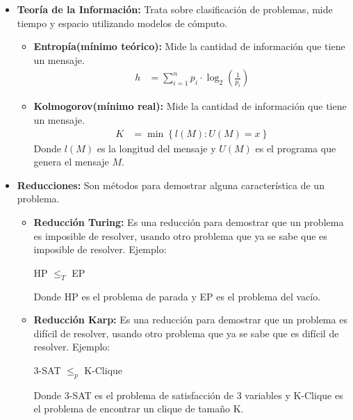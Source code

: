 \documentclass{templateNote}
\begin{document}
\begin{itemize}
\begin{itemize}
        \item \textbf{Teoría de la Información:} Trata sobre clasificación de problemas, mide tiempo y espacio utilizando modelos de cómputo.
        \begin{itemize}
            \item \textbf{Entropía(mínimo teórico):} Mide la cantidad de información que tiene un mensaje.
            \begin{align*}
                h &=  \sum_{i=1}^{n} p_i \cdot \log_2 \left( \frac{1}{p_i} \right)
            \end{align*}
                
            \item \textbf{Kolmogorov(mínimo real):} Mide la cantidad de información que tiene un mensaje.
            \begin{align*}
                K &= \min \left\{ l(M) : U(M) = x \right\}
            \end{align*}
            Donde $l(M)$ es la longitud del mensaje y $U(M)$ es el programa que genera el mensaje $M$.
        \end{itemize}

        \item \textbf{Reducciones:} Son métodos para demostrar alguna característica de un problema.
        \begin{itemize}
            \item \textbf{Reducción Turing:} Es una reducción para demostrar que un problema es imposible de resolver, usando otro problema que ya se sabe que es imposible de resolver.
            Ejemplo:

            \begin{center}
                HP $\leq_T$ EP
            \end{center}
            Donde HP es el problema de parada y EP es el problema del vacío.
            \\
            \item \textbf{Reducción Karp:} Es una reducción para demostrar que un problema es difícil de resolver, usando otro problema que ya se sabe que es difícil de resolver.
            Ejemplo:

            \begin{center}
                3-SAT $\leq_p$ K-Clique
            \end{center}
            Donde 3-SAT es el problema de satisfacción de 3 variables y K-Clique es el problema de encontrar un clique de tamaño K.
            \\
        \end{itemize}
    \end{itemize}
    

\end{itemize}
\end{document}
